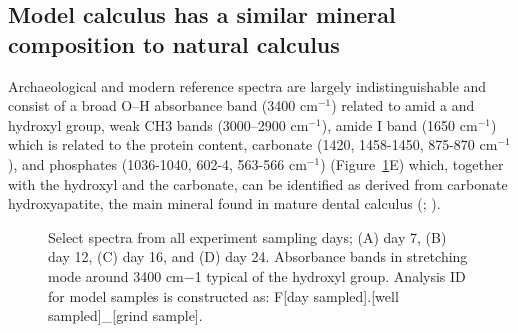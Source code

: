 \documentclass[
  b5paper,
]{book}
\begin{document}
\subsection{Model calculus has a similar mineral composition to natural
calculus}\label{model-calculus-has-a-similar-mineral-composition-to-natural-calculus}

Archaeological and modern reference spectra are largely
indistinguishable and consist of a broad O--H absorbance band (3400
cm\(^{-1}\)) related to amid a and hydroxyl group, weak CH3 bands
(3000--2900 cm\(^{-1}\)), amide I band (1650 cm\(^{-1}\)) which is
related to the protein content, carbonate (1420, 1458-1450, 875-870
cm\(^{-1}\)), and phosphates (1036-1040, 602-4, 563-566 cm\(^{-1}\))
(Figure~\ref{fig-ftir-spectra}E) which, together with the hydroxyl and
the carbonate, can be identified as derived from carbonate
hydroxyapatite, the main mineral found in mature dental calculus
(;
).

\begin{figure}


\caption{\label{fig-ftir-spectra}Select spectra from all experiment
sampling days; (A) day 7, (B) day 12, (C) day 16, and (D) day 24.
Absorbance bands in stretching mode around 3400 cm−1 typical of the
hydroxyl group. Analysis ID for model samples is constructed as: F{[}day
sampled{]}.{[}well sampled{]}\_{[}grind sample{]}.}

\end{figure}%
\end{document}
